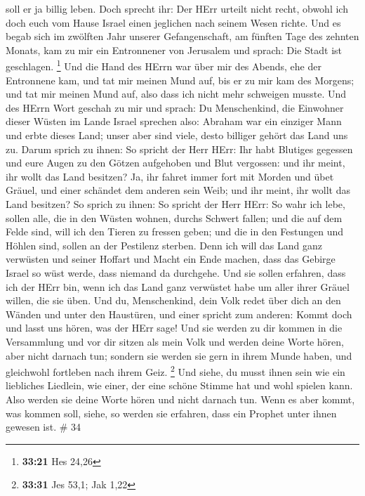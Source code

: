 soll er ja billig leben.  Doch sprecht ihr: Der HErr
urteilt nicht recht, obwohl ich doch euch vom Hause Israel einen
jeglichen nach seinem Wesen richte.  Und es begab sich im
zwölften Jahr unserer Gefangenschaft, am fünften Tage des zehnten
Monats, kam zu mir ein Entronnener von Jerusalem und sprach: Die Stadt
ist geschlagen. \footnote{\textbf{33:21} Hes 24,26}  Und
die Hand des HErrn war über mir des Abends, ehe der Entronnene kam, und
tat mir meinen Mund auf, bis er zu mir kam des Morgens; und tat mir
meinen Mund auf, also dass ich nicht mehr schweigen musste.
 Und des HErrn Wort geschah zu mir und sprach:
 Du Menschenkind, die Einwohner dieser Wüsten im Lande
Israel sprechen also: Abraham war ein einziger Mann und erbte dieses
Land; unser aber sind viele, desto billiger gehört das Land uns zu.
 Darum sprich zu ihnen: So spricht der Herr HErr: Ihr habt
Blutiges gegessen und eure Augen zu den Götzen aufgehoben und Blut
vergossen: und ihr meint, ihr wollt das Land besitzen?  Ja,
ihr fahret immer fort mit Morden und übet Gräuel, und einer schändet dem
anderen sein Weib; und ihr meint, ihr wollt das Land besitzen?
 So sprich zu ihnen: So spricht der Herr HErr: So wahr ich
lebe, sollen alle, die in den Wüsten wohnen, durchs Schwert fallen; und
die auf dem Felde sind, will ich den Tieren zu fressen geben; und die in
den Festungen und Höhlen sind, sollen an der Pestilenz sterben.
 Denn ich will das Land ganz verwüsten und seiner Hoffart
und Macht ein Ende machen, dass das Gebirge Israel so wüst werde, dass
niemand da durchgehe.  Und sie sollen erfahren, dass ich
der HErr bin, wenn ich das Land ganz verwüstet habe um aller ihrer
Gräuel willen, die sie üben.  Und du, Menschenkind, dein
Volk redet über dich an den Wänden und unter den Haustüren, und einer
spricht zum anderen: Kommt doch und lasst uns hören, was der HErr sage!
 Und sie werden zu dir kommen in die Versammlung und vor
dir sitzen als mein Volk und werden deine Worte hören, aber nicht
darnach tun; sondern sie werden sie gern in ihrem Munde haben, und
gleichwohl fortleben nach ihrem Geiz. \footnote{\textbf{33:31} Jes 53,1;
  Jak 1,22}  Und siehe, du musst ihnen sein wie ein
liebliches Liedlein, wie einer, der eine schöne Stimme hat und wohl
spielen kann. Also werden sie deine Worte hören und nicht darnach tun.
 Wenn es aber kommt, was kommen soll, siehe, so werden sie
erfahren, dass ein Prophet unter ihnen gewesen ist. \# 34 
